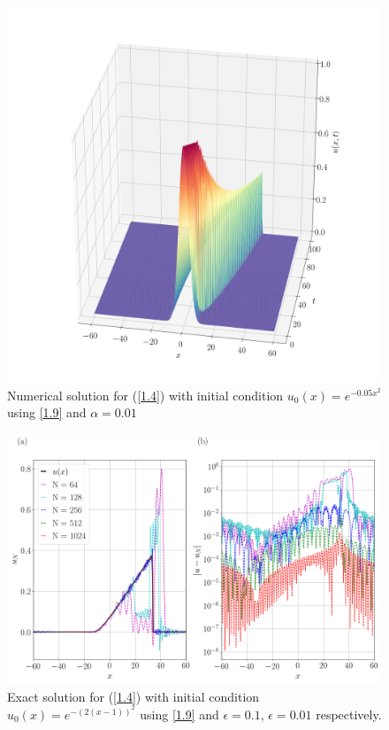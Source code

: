 	\begin{figure}
		\includegraphics[width=\textwidth]{Figures/Galerkin/Graphics/eps=0.01/Numerical_Solution_alpha=001.png}
		\caption{Numerical solution for (\ref{1.4}) with initial condition $u_0 (x) = e^{- 0.05 x^2}$ using \ref{1.9} and $\alpha = 0.01$}
		\label{Exact_Solution}
	\end{figure}
	\begin{figure}
		\includegraphics[width=\textwidth]{Figures/Galerkin/Graphics/eps=0.01/Numerical_Solution_alpha=001_T=100.png}
		\caption{Exact solution for (\ref{1.4}) with initial condition $u_0 (x) = e^{-(2(x - 1))^2}$ using \ref{1.9} and $\epsilon = 0.1$, $\epsilon = 0.01$ respectively.}
		\label{Exact_Solution}
	\end{figure}
